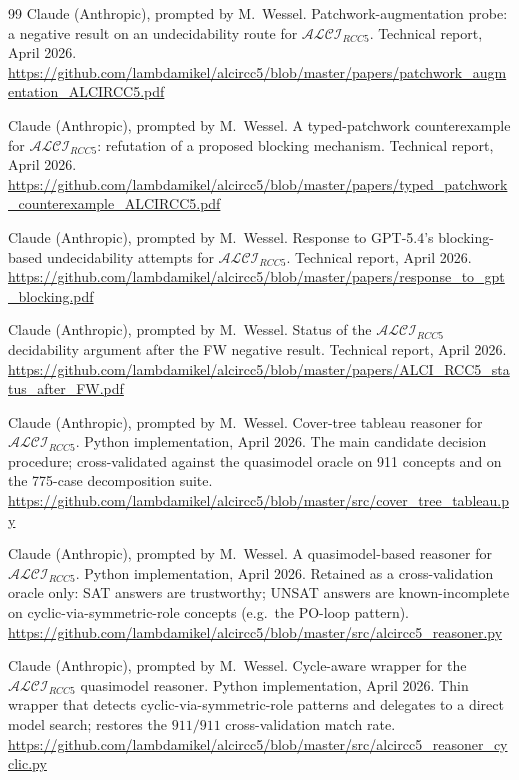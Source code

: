 \documentclass[
]{ceurart}
\theoremstyle{definition}
\newcommand{\ALCIRCC}[1]{\ensuremath{\mathcal{ALCI}_{\mathit{RCC#1}}}}
\begin{document}
\begin{thebibliography}{99}
Claude (Anthropic), prompted by M.\ Wessel.
\newblock Patchwork-augmentation probe: a negative result on an
  undecidability route for $\ALCIRCC{5}$.
\newblock Technical report, April 2026.
\newblock \url{https://github.com/lambdamikel/alcircc5/blob/master/papers/patchwork_augmentation_ALCIRCC5.pdf}

Claude (Anthropic), prompted by M.\ Wessel.
\newblock A typed-patchwork counterexample for $\ALCIRCC{5}$:
  refutation of a proposed blocking mechanism.
\newblock Technical report, April 2026.
\newblock \url{https://github.com/lambdamikel/alcircc5/blob/master/papers/typed_patchwork_counterexample_ALCIRCC5.pdf}

Claude (Anthropic), prompted by M.\ Wessel.
\newblock Response to GPT-5.4's blocking-based undecidability
  attempts for $\ALCIRCC{5}$.
\newblock Technical report, April 2026.
\newblock \url{https://github.com/lambdamikel/alcircc5/blob/master/papers/response_to_gpt_blocking.pdf}

Claude (Anthropic), prompted by M.\ Wessel.
\newblock Status of the $\ALCIRCC{5}$ decidability argument after
  the FW negative result.
\newblock Technical report, April 2026.
\newblock \url{https://github.com/lambdamikel/alcircc5/blob/master/papers/ALCI_RCC5_status_after_FW.pdf}

Claude (Anthropic), prompted by M.\ Wessel.
\newblock Cover-tree tableau reasoner for $\ALCIRCC{5}$.
\newblock Python implementation, April 2026.
\newblock The main candidate decision procedure; cross-validated
  against the quasimodel oracle on 911 concepts and on the 775-case
  decomposition suite.
\newblock \url{https://github.com/lambdamikel/alcircc5/blob/master/src/cover_tree_tableau.py}

Claude (Anthropic), prompted by M.\ Wessel.
\newblock A quasimodel-based reasoner for $\ALCIRCC{5}$.
\newblock Python implementation, April 2026.
\newblock Retained as a cross-validation oracle only: SAT answers
  are trustworthy; UNSAT answers are known-incomplete on
  cyclic-via-symmetric-role concepts (e.g.\ the PO-loop pattern).
\newblock \url{https://github.com/lambdamikel/alcircc5/blob/master/src/alcircc5_reasoner.py}

Claude (Anthropic), prompted by M.\ Wessel.
\newblock Cycle-aware wrapper for the $\ALCIRCC{5}$ quasimodel
  reasoner.
\newblock Python implementation, April 2026.
\newblock Thin wrapper that detects cyclic-via-symmetric-role
  patterns and delegates to a direct model search; restores the
  $911/911$ cross-validation match rate.
\newblock \url{https://github.com/lambdamikel/alcircc5/blob/master/src/alcircc5_reasoner_cyclic.py}


\end{thebibliography}
\end{document}
